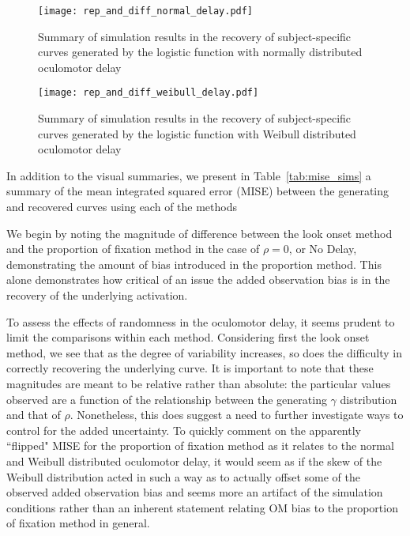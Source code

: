 \begin{figure}[H]
\centering
\texttt{[image: rep\_and\_diff\_normal\_delay.pdf]}
\caption{Summary of simulation results in the recovery of subject-specific curves generated by the logistic function with normally distributed oculomotor delay}
\label{fig:panel_normal_delay}
\end{figure}



\begin{figure}[H]
\centering
\texttt{[image: rep\_and\_diff\_weibull\_delay.pdf]}
\caption{Summary of simulation results in the recovery of subject-specific curves generated by the logistic function with Weibull distributed oculomotor delay}
\label{fig:panel_weibull_delay}
\end{figure}



In addition to the visual summaries, we present in Table~\ref{tab:mise_sims} a summary of the mean integrated squared error (MISE) between the generating and recovered curves using each of the methods

We begin by noting the  magnitude of difference between the look onset method and the proportion of fixation method in the case of $\rho = 0$, or No Delay, demonstrating the amount of bias introduced in the proportion method. This alone demonstrates how critical of an issue the added observation bias is in the recovery of the underlying activation.

To assess the effects of randomness in the oculomotor delay, it seems prudent to limit the comparisons within each method. Considering first the look onset method, we see that as the degree of variability increases, so does the difficulty in correctly recovering the underlying curve. It is important to note that these magnitudes are meant to be relative rather than absolute: the particular values observed are a function of the relationship between the generating $\gamma$ distribution and that of $\rho$. Nonetheless, this does suggest a need to further investigate ways to control for the added uncertainty. To quickly comment on the apparently ``flipped" MISE for the proportion of fixation method as it relates to the normal and Weibull distributed oculomotor delay, it would seem as if the skew of the Weibull distribution acted in such a way as to actually offset some of the observed added observation bias and seems more an artifact of the simulation conditions rather than an inherent statement relating OM bias to the proportion of fixation method in general.

